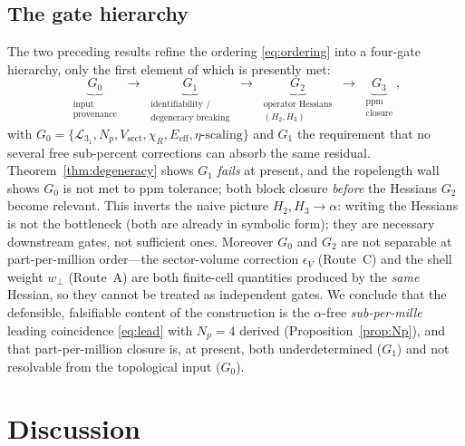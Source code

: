 \documentclass[11pt,a4paper]{article}
\theoremstyle{definition}
\begin{document}
\subsection*{The gate hierarchy}
The two preceding results refine the ordering \eqref{eq:ordering} into a four-gate
hierarchy, only the first element of which is presently met:
\begin{equation}
  \underbrace{G_0}_{\substack{\text{input}\\\text{provenance}}}
  \;\longrightarrow\;
  \underbrace{G_1}_{\substack{\text{identifiability /}\\\text{degeneracy breaking}}}
  \;\longrightarrow\;
  \underbrace{G_2}_{\substack{\text{operator Hessians}\\(H_2,H_3)}}
  \;\longrightarrow\;
  \underbrace{G_3}_{\substack{\text{ppm}\\\text{closure}}},
  \label{eq:gatehierarchy}
\end{equation}
with
$G_0=\{\mathcal{L}_{3_1},N_p,V_{\mathrm{sect}},\chi_R,E_{\mathrm{eff}},\eta\text{-scaling}\}$
and $G_1$ the requirement that no several free sub-percent corrections can absorb
the same residual. Theorem~\ref{thm:degeneracy} shows $G_1$ \emph{fails} at present,
and the ropelength wall shows $G_0$ is not met to ppm tolerance; both block closure
\emph{before} the Hessians $G_2$ become relevant. This inverts the naive picture
$H_2,H_3\to\alpha$: writing the Hessians is not the bottleneck (both are already in
symbolic form); they are necessary downstream gates, not sufficient ones. Moreover
$G_0$ and $G_2$ are not separable at part-per-million order---the sector-volume
correction $\epsilon_V$ (Route~C) and the shell weight $w_\perp$ (Route~A) are both
finite-cell quantities produced by the \emph{same} Hessian, so they cannot be
treated as independent gates. We conclude that the defensible, falsifiable content
of the construction is the $\alpha$-free \emph{sub-per-mille} leading coincidence
\eqref{eq:lead} with $N_p=4$ derived (Proposition~\ref{prop:Np}), and that
part-per-million closure is, at present, both underdetermined ($G_1$) and not
resolvable from the topological input ($G_0$).
\section{Discussion}
\label{sec:discussion}
\end{document}
